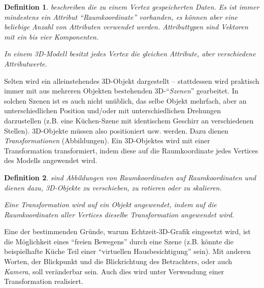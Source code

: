 \documentclass[twoside,a4paper,fleqn,12pt]{book}
\newtheorem{defn}{Definition}
\begin{document}
\begin{defn}
 beschreiben die zu einem Vertex gespeicherten Daten. Es ist immer mindestens
ein Attribut "`Raumkoordinate"' vorhanden, es können aber eine beliebige Anzahl von Attributen verwendet werden.
Attributtypen sind Vektoren mit ein bis vier Komponenten.

In einem 3D-Modell besitzt jedes Vertex die gleichen Attribute, aber verschiedene Attribut\emph{werte}.
\end{defn}

Selten wird ein alleinstehendes 3D-Objekt dargestellt -- stattdessen wird praktisch immer mit aus mehreren Objekten
bestehenden 3D-"`\emph{Szenen}"' gearbeitet. In solchen Szenen ist es auch nicht unüblich, das selbe Objekt mehrfach,
aber an unterschiedlichen Position \mbox{und/oder} mit unterschiedlichen Drehungen darzustellen (z.B. eine Küchen-Szene mit identischem
Geschirr an verschiedenen Stellen). 3D-Objekte müssen also positioniert usw. werden. Dazu dienen \emph{Transformationen}
(Abbildungen). Ein 3D-Objektes wird mit einer Transformation transformiert, indem diese auf die Raumkoordinate jedes Vertices
des Modells angewendet wird.

\begin{defn}
 sind Abbildungen von Raumkoordinaten auf Raumkoordinaten und dienen dazu,
3D-Objekte zu verschieben, zu rotieren oder zu skalieren.

Eine Transformation wird auf ein Objekt angewendet, indem auf die Raumkoordinaten aller Vertices dieselbe Transformation angewendet wird.
\end{defn}


Eine der bestimmenden Gründe, warum Echtzeit-3D-Grafik eingesetzt wird, ist die Möglichkeit eines "`freien Bewegens"' durch
eine Szene (z.B. könnte die beispielhafte Küche Teil einer "`virtuellen Hausbesichtigung"' sein).
Mit anderen Worten, der Blickpunkt und die Blickrichtung des Betrachters, oder auch \emph{Kamera}, soll veränderbar sein.
Auch dies wird unter Verwendung einer Transformation realisiert.
\end{document}
